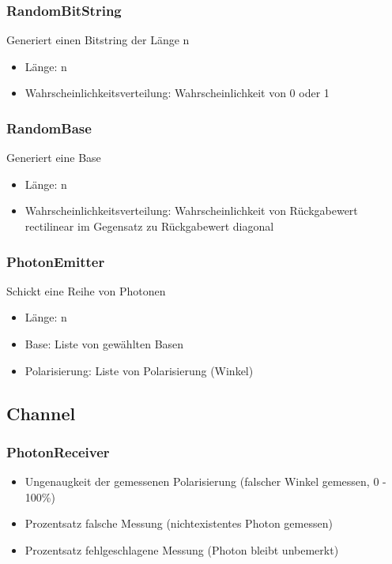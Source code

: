 \documentclass[a4paper,10.2pt,pdftex]{scrartcl}%
\begin{document}
\subsubsection*{RandomBitString}
Generiert einen Bitstring der Länge n
\begin{itemize}
\item Länge: n
\item Wahrscheinlichkeitsverteilung: Wahrscheinlichkeit von 0 oder 1
\end{itemize}
\subsubsection*{RandomBase}
Generiert eine Base 
\begin{itemize}
\item  Länge: n     
\item  Wahrscheinlichkeitsverteilung: Wahrscheinlichkeit von Rückgabewert rectilinear im Gegensatz zu Rückgabewert diagonal
\end{itemize}

\subsubsection*{PhotonEmitter}
Schickt eine Reihe von Photonen 
\begin{itemize}
\item  Länge: n
\item  Base: Liste von gewählten Basen
\item  Polarisierung: Liste von Polarisierung (Winkel)
\end{itemize}

\subsection{Channel}



\subsubsection*{PhotonReceiver}
\begin{itemize}
\item  Ungenaugkeit der gemessenen Polarisierung (falscher Winkel gemessen, 0 - 100\%) 
\item  Prozentsatz falsche Messung (nichtexistentes Photon gemessen)
\item  Prozentsatz fehlgeschlagene Messung (Photon bleibt unbemerkt)
\end{itemize}
\end{document}
